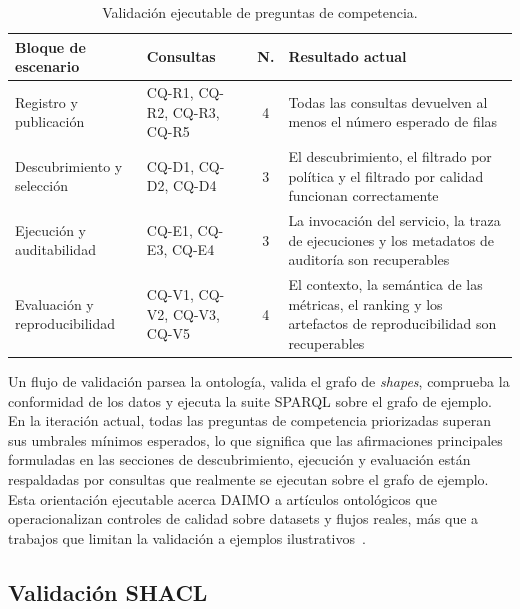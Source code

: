\documentclass[11pt,a4paper]{article}
\newcommand{\cq}[1]{\textsf{#1}}
\begin{document}
\begin{table}[t]
\caption{Validación ejecutable de preguntas de competencia.}
\label{tab:cqs}
\centering
\small
\begin{tabularx}{\textwidth}{@{}L{3cm}L{4cm}cX@{}}
\toprule
\textbf{Bloque de escenario} & \textbf{Consultas} & \textbf{N.} & \textbf{Resultado actual} \\
\midrule
Registro y publicación & \cq{CQ-R1}, \cq{CQ-R2}, \cq{CQ-R3}, \cq{CQ-R5} & 4 & Todas las consultas devuelven al menos el número esperado de filas \\[0.4em]
Descubrimiento y selección & \cq{CQ-D1}, \cq{CQ-D2}, \cq{CQ-D4} & 3 & El descubrimiento, el filtrado por política y el filtrado por calidad funcionan correctamente \\[0.4em]
Ejecución y auditabilidad & \cq{CQ-E1}, \cq{CQ-E3}, \cq{CQ-E4} & 3 & La invocación del servicio, la traza de ejecuciones y los metadatos de auditoría son recuperables \\[0.4em]
Evaluación y reproducibilidad & \cq{CQ-V1}, \cq{CQ-V2}, \cq{CQ-V3}, \cq{CQ-V5} & 4 & El contexto, la semántica de las métricas, el ranking y los artefactos de reproducibilidad son recuperables \\
\bottomrule
\end{tabularx}
\end{table}

Un flujo de validación parsea la ontología, valida el grafo de \emph{shapes}, comprueba la conformidad de los datos y ejecuta la suite SPARQL sobre el grafo de ejemplo. En la iteración actual, todas las preguntas de competencia priorizadas superan sus umbrales mínimos esperados, lo que significa que las afirmaciones principales formuladas en las secciones de descubrimiento, ejecución y evaluación están respaldadas por consultas que realmente se ejecutan sobre el grafo de ejemplo. Esta orientación ejecutable acerca DAIMO a artículos ontológicos que operacionalizan controles de calidad sobre datasets y flujos reales, más que a trabajos que limitan la validación a ejemplos ilustrativos~\cite{woods,bareedu24,ferranti}.

\subsection{Validación SHACL}
\end{document}
